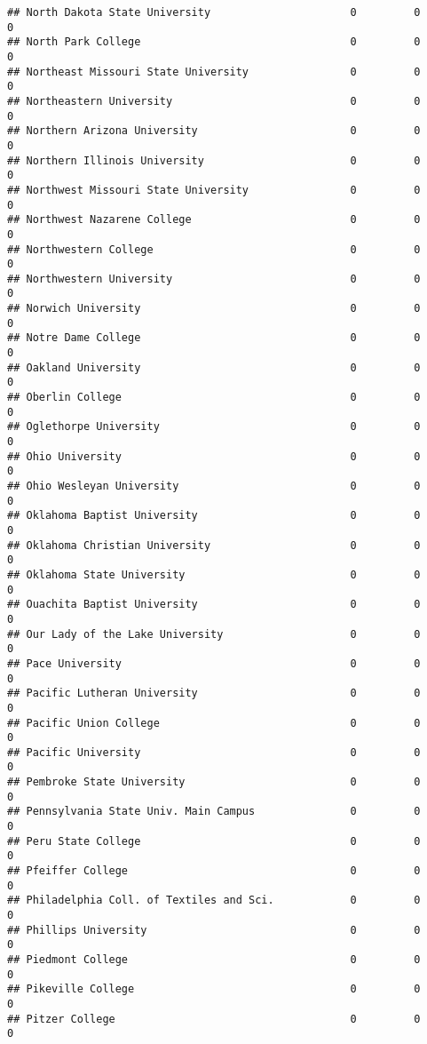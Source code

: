 \documentclass[
]{article}
\begin{document}
\begin{verbatim}
## North Dakota State University                      0         0         0
## North Park College                                 0         0         0
## Northeast Missouri State University                0         0         0
## Northeastern University                            0         0         0
## Northern Arizona University                        0         0         0
## Northern Illinois University                       0         0         0
## Northwest Missouri State University                0         0         0
## Northwest Nazarene College                         0         0         0
## Northwestern College                               0         0         0
## Northwestern University                            0         0         0
## Norwich University                                 0         0         0
## Notre Dame College                                 0         0         0
## Oakland University                                 0         0         0
## Oberlin College                                    0         0         0
## Oglethorpe University                              0         0         0
## Ohio University                                    0         0         0
## Ohio Wesleyan University                           0         0         0
## Oklahoma Baptist University                        0         0         0
## Oklahoma Christian University                      0         0         0
## Oklahoma State University                          0         0         0
## Ouachita Baptist University                        0         0         0
## Our Lady of the Lake University                    0         0         0
## Pace University                                    0         0         0
## Pacific Lutheran University                        0         0         0
## Pacific Union College                              0         0         0
## Pacific University                                 0         0         0
## Pembroke State University                          0         0         0
## Pennsylvania State Univ. Main Campus               0         0         0
## Peru State College                                 0         0         0
## Pfeiffer College                                   0         0         0
## Philadelphia Coll. of Textiles and Sci.            0         0         0
## Phillips University                                0         0         0
## Piedmont College                                   0         0         0
## Pikeville College                                  0         0         0
## Pitzer College                                     0         0         0

\end{verbatim}
\end{document}
